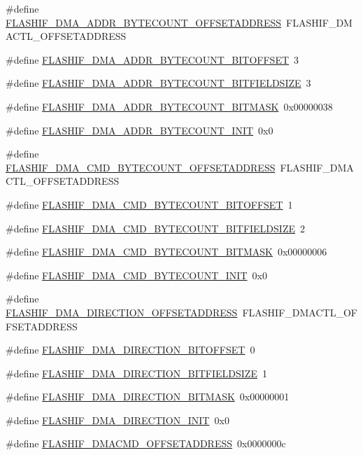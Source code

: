 \begin{DoxyCompactItemize}
\#define \hyperlink{a00552_a1e0f8382e434e72b45e5729af616c1b7}{FLASHIF\_\-DMA\_\-ADDR\_\-BYTECOUNT\_\-OFFSETADDRESS}~FLASHIF\_\-DMACTL\_\-OFFSETADDRESS
\item 
\#define \hyperlink{a00552_a81dbb9ec3eb96d2bbf148630cbfe88b1}{FLASHIF\_\-DMA\_\-ADDR\_\-BYTECOUNT\_\-BITOFFSET}~3
\item 
\#define \hyperlink{a00552_af276a7fc6683d4d9a760ca37bf04b95b}{FLASHIF\_\-DMA\_\-ADDR\_\-BYTECOUNT\_\-BITFIELDSIZE}~3
\item 
\#define \hyperlink{a00552_a769ef02e2c0140821e7618c16b8ed0cb}{FLASHIF\_\-DMA\_\-ADDR\_\-BYTECOUNT\_\-BITMASK}~0x00000038
\item 
\#define \hyperlink{a00552_ad0ec227a0cee79d86a83477037ed3a55}{FLASHIF\_\-DMA\_\-ADDR\_\-BYTECOUNT\_\-INIT}~0x0
\item 
\#define \hyperlink{a00552_ad4a583e9bcc35bc62310af2529160e2c}{FLASHIF\_\-DMA\_\-CMD\_\-BYTECOUNT\_\-OFFSETADDRESS}~FLASHIF\_\-DMACTL\_\-OFFSETADDRESS
\item 
\#define \hyperlink{a00552_a2a9d1e29a0ee61f31b560b27ecc9b754}{FLASHIF\_\-DMA\_\-CMD\_\-BYTECOUNT\_\-BITOFFSET}~1
\item 
\#define \hyperlink{a00552_a8e4c853dc0d5a73d9eb2f268635e699c}{FLASHIF\_\-DMA\_\-CMD\_\-BYTECOUNT\_\-BITFIELDSIZE}~2
\item 
\#define \hyperlink{a00552_ae0c1bf92e6759a7db97bda066b8473b4}{FLASHIF\_\-DMA\_\-CMD\_\-BYTECOUNT\_\-BITMASK}~0x00000006
\item 
\#define \hyperlink{a00552_a64880b681e953503b88b4b1941d5c010}{FLASHIF\_\-DMA\_\-CMD\_\-BYTECOUNT\_\-INIT}~0x0
\item 
\#define \hyperlink{a00552_a5aa8a4595966b83cd5c3d183b1c27146}{FLASHIF\_\-DMA\_\-DIRECTION\_\-OFFSETADDRESS}~FLASHIF\_\-DMACTL\_\-OFFSETADDRESS
\item 
\#define \hyperlink{a00552_a33eb8156012c3094be7968e0c7f49367}{FLASHIF\_\-DMA\_\-DIRECTION\_\-BITOFFSET}~0
\item 
\#define \hyperlink{a00552_a038ac39653e7b75ebd2436a298cd5105}{FLASHIF\_\-DMA\_\-DIRECTION\_\-BITFIELDSIZE}~1
\item 
\#define \hyperlink{a00552_aa8b2e50f2f6f888f3b5917f71adfd3d8}{FLASHIF\_\-DMA\_\-DIRECTION\_\-BITMASK}~0x00000001
\item 
\#define \hyperlink{a00552_ad29cbe99468e95a225750d19543839f2}{FLASHIF\_\-DMA\_\-DIRECTION\_\-INIT}~0x0
\item 
\#define \hyperlink{a00552_aa702c12fc13a639428f66cb9faeac7c6}{FLASHIF\_\-DMACMD\_\-OFFSETADDRESS}~0x0000000c

\end{DoxyCompactItemize}
